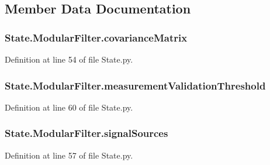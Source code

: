 \subsection{Member Data Documentation}
\subsubsection[{\texorpdfstring{covariance\+Matrix}{covarianceMatrix}}]{\setlength{\rightskip}{0pt plus 5cm}State.\+Modular\+Filter.\+covariance\+Matrix}\hypertarget{classState_1_1ModularFilter_a1981026f261047a45a6a7d89bbf1b7de}{}\label{classState_1_1ModularFilter_a1981026f261047a45a6a7d89bbf1b7de}


Definition at line 54 of file State.\+py.

\subsubsection[{\texorpdfstring{measurement\+Validation\+Threshold}{measurementValidationThreshold}}]{\setlength{\rightskip}{0pt plus 5cm}State.\+Modular\+Filter.\+measurement\+Validation\+Threshold}\hypertarget{classState_1_1ModularFilter_adf637093941f85a6ca14a122f232657a}{}\label{classState_1_1ModularFilter_adf637093941f85a6ca14a122f232657a}


Definition at line 60 of file State.\+py.

\subsubsection[{\texorpdfstring{signal\+Sources}{signalSources}}]{\setlength{\rightskip}{0pt plus 5cm}State.\+Modular\+Filter.\+signal\+Sources}\hypertarget{classState_1_1ModularFilter_a23afc4a8d6b45e56b68ab99d8b9d9efa}{}\label{classState_1_1ModularFilter_a23afc4a8d6b45e56b68ab99d8b9d9efa}


Definition at line 57 of file State.\+py.


